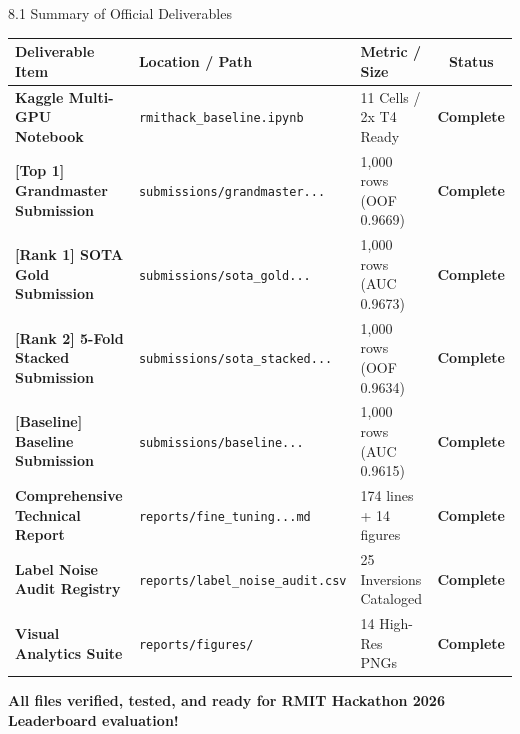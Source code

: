 \documentclass[aspectratio=169]{beamer}
\begin{document}
\begin{frame}{8.1 Summary of Official Deliverables}
\begin{table}[h]
\centering
\fontsize{6.5pt}{8pt}\selectfont
\begin{tabular}{@{}p{}p{}p{}c@{}}
\toprule
\textbf{Deliverable Item} & \textbf{Location / Path} & \textbf{Metric / Size} & \textbf{Status} \\ \midrule
\textbf{Kaggle Multi-GPU Notebook} & \texttt{rmithack\_baseline.ipynb} & 11 Cells / 2x T4 Ready & \textcolor{SafeGreen}{\textbf{Complete}} \\
\textbf{[Top 1] Grandmaster Submission} & \texttt{submissions/grandmaster...} & 1,000 rows (OOF 0.9669) & \textcolor{SafeGreen}{\textbf{Complete}} \\
\textbf{[Rank 1] SOTA Gold Submission} & \texttt{submissions/sota\_gold...} & 1,000 rows (AUC 0.9673) & \textcolor{SafeGreen}{\textbf{Complete}} \\
\textbf{[Rank 2] 5-Fold Stacked Submission} & \texttt{submissions/sota\_stacked...} & 1,000 rows (OOF 0.9634) & \textcolor{SafeGreen}{\textbf{Complete}} \\
\textbf{[Baseline] Baseline Submission} & \texttt{submissions/baseline...} & 1,000 rows (AUC 0.9615) & \textcolor{SafeGreen}{\textbf{Complete}} \\
\textbf{Comprehensive Technical Report} & \texttt{reports/fine\_tuning...md} & 174 lines + 14 figures & \textcolor{SafeGreen}{\textbf{Complete}} \\
\textbf{Label Noise Audit Registry} & \texttt{reports/label\_noise\_audit.csv} & 25 Inversions Cataloged & \textcolor{SafeGreen}{\textbf{Complete}} \\
\textbf{Visual Analytics Suite} & \texttt{reports/figures/} & 14 High-Res PNGs & \textcolor{SafeGreen}{\textbf{Complete}} \\ \bottomrule
\end{tabular}
\end{table}

\vspace{0.15cm}
\begin{center}
\textbf{All files verified, tested, and ready for RMIT Hackathon 2026 Leaderboard evaluation!}
\end{center}
\end{frame}
\end{document}
